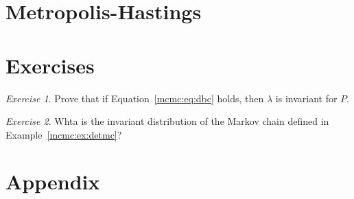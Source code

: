 \documentclass[12pt]{article}
\theoremstyle{plain}
\theoremstyle{definition}
\theoremstyle{remark}
\newtheorem{hw}{Exercise}[section]
\begin{document}
\section{Metropolis-Hastings}
\label{mcmc:sec:mh}


\section*{Exercises}
\begin{hw}
  \label{mcmc:hw:dbc}
Prove that if Equation~\ref{mcmc:eq:dbc} holds, then $\lambda$ is
invariant for $P$.
\end{hw}

\begin{hw}
Whta is the invariant distribution of the Markov chain defined in
Example~\ref{mcmc:ex:detmc}?
\end{hw}


\newpage

\section*{Appendix}





\end{document}
